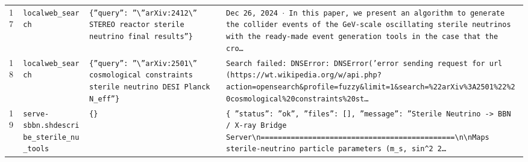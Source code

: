 \documentclass[11pt,a4paper]{article}
\begin{document}
\begin{longtable}{@{}p{}p{}p{}p{}@{}}
17 & \texttt{local}\newline\texttt{web\_\allowbreak{}search} & \texttt{\{''query'':\allowbreak{} ''\textbackslash{}\allowbreak{}''arXiv:\allowbreak{}2412\textbackslash{}\allowbreak{}'' STEREO reactor sterile neutrino final results''\}\allowbreak{}} & \texttt{Dec 26,\allowbreak{} 2024 $\cdot$ In this paper,\allowbreak{} we present an algorithm to generate the collider events of the GeV-scale oscillating sterile neutrinos with the ready-made event generation tools in the case that the cro\ldots{}\allowbreak{}} \\
18 & \texttt{local}\newline\texttt{web\_\allowbreak{}search} & \texttt{\{''query'':\allowbreak{} ''\textbackslash{}\allowbreak{}''arXiv:\allowbreak{}2501\textbackslash{}\allowbreak{}'' cosmological constraints sterile neutrino DESI Planck N\_\allowbreak{}eff''\}\allowbreak{}} & \texttt{Search failed:\allowbreak{} DNSError:\allowbreak{} DNSError('error sending request for url (https:\allowbreak{}/\allowbreak{}/\allowbreak{}wt.wikipedia.org/\allowbreak{}w/\allowbreak{}api.php?action=\allowbreak{}opensearch\&profile=\allowbreak{}fuzzy\&limit=\allowbreak{}1\&search=\allowbreak{}\%22arXiv\%3A2501\%22\%20cosmological\%20constraints\%20st\ldots{}\allowbreak{}} \\
19 & \texttt{serve-sbbn.sh}\newline\texttt{describe\_\allowbreak{}sterile\_\allowbreak{}nu\_\allowbreak{}tools} & \texttt{\{\}\allowbreak{}} & \texttt{\{   ''status'':\allowbreak{} ''ok'',\allowbreak{}   ''files'':\allowbreak{} []\allowbreak{},\allowbreak{}   ''message'':\allowbreak{} ''Sterile Neutrino -\textgreater{}\allowbreak{} BBN /\allowbreak{} X-ray Bridge Server\textbackslash{}\allowbreak{}n=\allowbreak{}=\allowbreak{}=\allowbreak{}=\allowbreak{}=\allowbreak{}=\allowbreak{}=\allowbreak{}=\allowbreak{}=\allowbreak{}=\allowbreak{}=\allowbreak{}=\allowbreak{}=\allowbreak{}=\allowbreak{}=\allowbreak{}=\allowbreak{}=\allowbreak{}=\allowbreak{}=\allowbreak{}=\allowbreak{}=\allowbreak{}=\allowbreak{}=\allowbreak{}=\allowbreak{}=\allowbreak{}=\allowbreak{}=\allowbreak{}=\allowbreak{}=\allowbreak{}=\allowbreak{}=\allowbreak{}=\allowbreak{}=\allowbreak{}=\allowbreak{}=\allowbreak{}=\allowbreak{}=\allowbreak{}=\allowbreak{}=\allowbreak{}=\allowbreak{}=\allowbreak{}=\allowbreak{}=\allowbreak{}=\allowbreak{}=\allowbreak{}\textbackslash{}\allowbreak{}n\textbackslash{}\allowbreak{}nMaps sterile-neutrino particle parameters (m\_\allowbreak{}s,\allowbreak{} sin\textasciicircum{}\allowbreak{}2 2\ldots{}\allowbreak{}} \\

\end{longtable}
\end{document}
